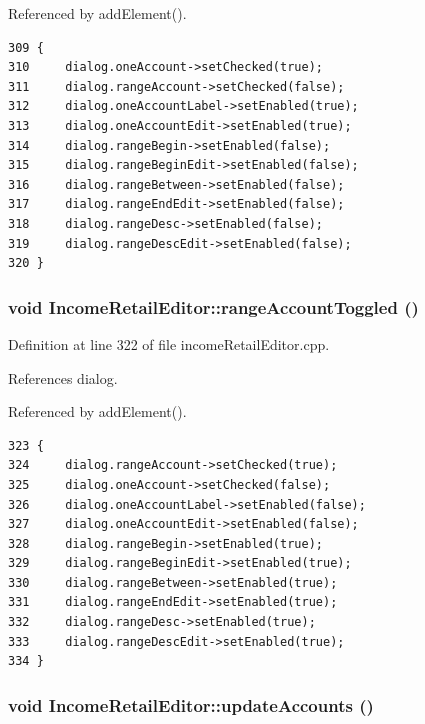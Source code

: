 Referenced by add\-Element().

\footnotesize\begin{verbatim}309 {
310     dialog.oneAccount->setChecked(true);
311     dialog.rangeAccount->setChecked(false);
312     dialog.oneAccountLabel->setEnabled(true);
313     dialog.oneAccountEdit->setEnabled(true);
314     dialog.rangeBegin->setEnabled(false);
315     dialog.rangeBeginEdit->setEnabled(false);
316     dialog.rangeBetween->setEnabled(false);
317     dialog.rangeEndEdit->setEnabled(false);
318     dialog.rangeDesc->setEnabled(false);
319     dialog.rangeDescEdit->setEnabled(false);
320 }
\end{verbatim}\normalsize 


\hypertarget{classIncomeRetailEditor_k6}{
\subsubsection[rangeAccountToggled]{\setlength{\rightskip}{0pt plus 5cm}void Income\-Retail\-Editor::range\-Account\-Toggled ()}}
\label{classIncomeRetailEditor_k6}


Definition at line 322 of file income\-Retail\-Editor.cpp.

References dialog.

Referenced by add\-Element().

\footnotesize\begin{verbatim}323 {
324     dialog.rangeAccount->setChecked(true);
325     dialog.oneAccount->setChecked(false);
326     dialog.oneAccountLabel->setEnabled(false);
327     dialog.oneAccountEdit->setEnabled(false);
328     dialog.rangeBegin->setEnabled(true);
329     dialog.rangeBeginEdit->setEnabled(true);
330     dialog.rangeBetween->setEnabled(true);
331     dialog.rangeEndEdit->setEnabled(true);
332     dialog.rangeDesc->setEnabled(true);
333     dialog.rangeDescEdit->setEnabled(true);
334 }
\end{verbatim}\normalsize 


\hypertarget{classIncomeRetailEditor_k7}{
\subsubsection[updateAccounts]{\setlength{\rightskip}{0pt plus 5cm}void Income\-Retail\-Editor::update\-Accounts ()}}
\label{classIncomeRetailEditor_k7}



